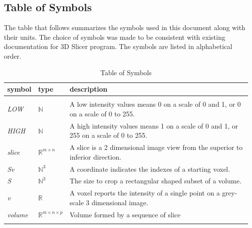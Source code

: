 \documentclass[12pt]{article}
\begin{document}

\subsection{Table of Symbols}

The table that follows summarizes the symbols used in this document along with
their units.  The choice of symbols was made to be consistent with existing documentation for 3D Slicer program. 
The symbols are listed in alphabetical order.

\renewcommand{\arraystretch}{1.2}
\noindent \begin{longtable}{l p{2cm} p{12cm}} \toprule
  \textbf{symbol} & \textbf{type} & \textbf{description}\\
  \midrule
\\
\textit{LOW} &  $\mathbb{N}$ &   A low intensity values means 0 on a scale of 0 and 1, or 0 on a scale of 0 to 255.
\\ 
\textit{HIGH} &  $\mathbb{N}$ &  A high intensity values means 1 on a scale of 0 and 1, or 255 on a scale of 0 to 255.
\\ 
\textit{slice} &  $\mathbb{R}^{m \times n}$ &  A slice is a 2 dimensional image view from the superior to inferior direction.
\\ 
\textit{Sv} & $\mathbb{N}^{3}$ &  A coordinate indicates the indexes of a starting voxel.
\\
\textit{S} & $\mathbb{N}^{3}$ &  The size to crop a rectangular shaped subset of a volume.
\\
\textit{v} &  $\mathbb{R}$ &  A voxel reports the intensity of a single point on a grey-scale 3 dimensional image.
\\
\textit{volume} & $\mathbb{R}^{m \times n \times p}$ &  Volume formed by a sequence of slice
\\

\bottomrule
\caption{Table of Symbols}
\label{Table of Symbols}
\end{longtable}
\end{document}
